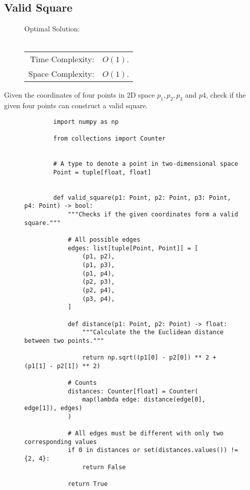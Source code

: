 
\subsection{Valid Square}

\begin{figure}[H]
    Optimal Solution:\\\\
    \begin{tabular}{rl}
        Time Complexity:& \(O(1)\).\\
        Space Complexity:& \(O(1)\).
    \end{tabular}
\end{figure}

Given the coordinates of four points in 2D space \(p_1, p_2, p_3\) and \(p4\),
check if the given four points can construct a valid square.

\begin{figure}[H]
    \centering
    \begin{verbatim}
        import numpy as np

        from collections import Counter


        # A type to denote a point in two-dimensional space
        Point = tuple[float, float]


        def valid_square(p1: Point, p2: Point, p3: Point, p4: Point) -> bool:
            """Checks if the given coordinates form a valid square."""

            # All possible edges
            edges: list[tuple[Point, Point]] = [
                (p1, p2),
                (p1, p3),
                (p1, p4),
                (p2, p3),
                (p2, p4),
                (p3, p4),
            ]

            def distance(p1: Point, p2: Point) -> float:
                """Calculate the the Euclidean distance between two points."""

                return np.sqrt((p1[0] - p2[0]) ** 2 + (p1[1] - p2[1]) ** 2)

            # Counts
            distances: Counter[float] = Counter(
                map(lambda edge: distance(edge[0], edge[1]), edges)
            )

            # All edges must be different with only two corresponding values
            if 0 in distances or set(distances.values()) != {2, 4}:
                return False

            return True
    \end{verbatim}
\end{figure}
